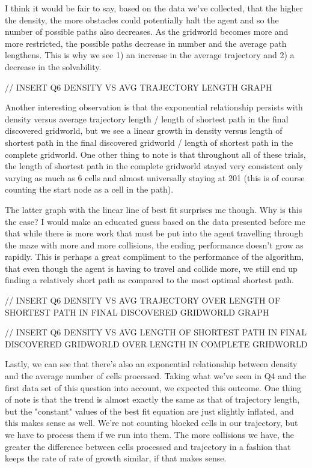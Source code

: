 \documentclass{homeworg}
\begin{document}
I think it would be fair to say, based on the data we've collected, that the higher the density, the more obstacles could potentially halt the agent and so the number of possible paths also decreases. As the gridworld becomes more and more restricted, the possible paths decrease in number and the average path lengthens. This is why we see 1) an increase in the average trajectory and 2) a decrease in the solvability.

// INSERT Q6 DENSITY VS AVG TRAJECTORY LENGTH GRAPH

Another interesting observation is that the exponential relationship persists with density versus average trajectory length / length of shortest path in the final discovered gridworld, but we see a linear growth in density versus length of shortest path in the final discovered gridworld / length of shortest path in the complete gridworld. One other thing to note is that throughout all of these trials, the length of shortest path in the complete gridworld stayed very consistent only varying as much as 6 cells and almost universally staying at 201 (this is of course counting the start node as a cell in the path).

The latter graph with the linear line of best fit surprises me though. Why is this the case? I would make an educated guess based on the data presented before me that while there is more work that must be put into the agent travelling through the maze with more and more collisions, the ending performance doesn't grow as rapidly. This is perhaps a great compliment to the performance of the algorithm, that even though the agent is having to travel and collide more, we still end up finding a relatively short path as compared to the most optimal shortest path. 

// INSERT Q6 DENSITY VS AVG TRAJECTORY OVER LENGTH OF SHORTEST PATH IN FINAL DISCOVERED GRIDWORLD GRAPH

// INSERT Q6 DENSITY VS AVG LENGTH OF SHORTEST PATH IN FINAL DISCOVERED GRIDWORLD OVER LENGTH IN COMPLETE GRIDWORLD

Lastly, we can see that there's also an exponential relationship between density and the average number of cells processed. Taking what we've seen in Q4 and the first data set of this question into account, we expected this outcome. One thing of note is that the trend is almost exactly the same as that of trajectory length, but the "constant" values of the best fit equation are just slightly inflated, and this makes sense as well. We're not counting blocked cells in our trajectory, but we have to process them if we run into them. The more collisions we have, the greater the difference between cells processed and trajectory in a fashion that keeps the rate of rate of growth similar, if that makes sense.
\end{document}
